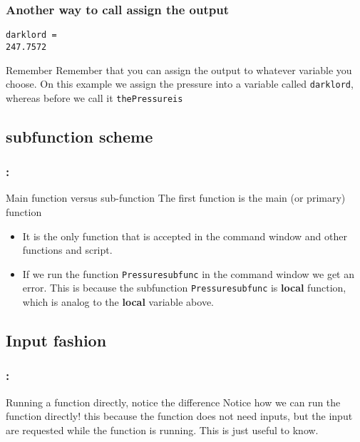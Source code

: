 \documentclass[11pt]{beamer}
\begin{document}
\begin{frame}[fragile]
	\frametitle{Another way to call assign the output}
	
	
	
	\begin{lstlisting}[caption = {The output for the script above is}]
darklord =
247.7572
	\end{lstlisting}
	
	\begin{exampleblock}{Remember}
		Remember that you can assign the output to whatever variable you choose. On this example we assign the pressure into a variable called \verb|darklord|, whereas before we call it \verb|thePressureis|
	\end{exampleblock}
	
\end{frame}

\subsection{subfunction scheme}
\begin{frame}[fragile]
	\frametitle{\secname: \subsecname}
	
	
	\begin{alertblock}{Main function versus sub-function}
		The first function is the main (or primary) function
		\begin{itemize}
			\item It is the only function that is accepted in the command window and other functions and script.
			\item If we run the function \verb|Pressuresubfunc| in the command window we get an error. This is because the subfunction \verb|Pressuresubfunc| is  \textbf{local} function, which is analog to the \textbf{local} variable above. 
		\end{itemize}
	\end{alertblock}
\end{frame}

\subsection{Input fashion}
\begin{frame}
	\frametitle{\secname: \subsecname}
	
	
	\begin{exampleblock}{Running a function directly, notice the difference}
		Notice how we can run the function directly! this because the function does not need inputs, but the input are requested while the function is running. This is just useful to know. 
	\end{exampleblock}
\end{frame}
\end{document}
